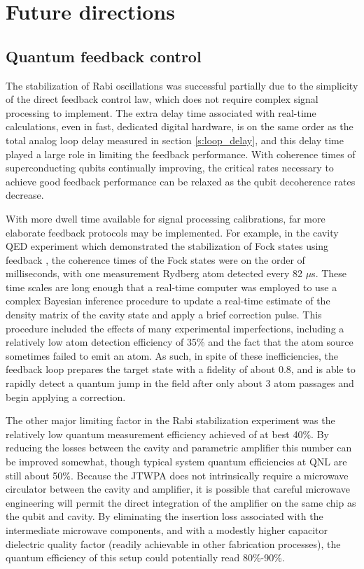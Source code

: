 \chapter{Future directions}
\label{c:conclusion}

\section{Quantum feedback control}

The stabilization of Rabi oscillations was successful partially due to the simplicity of the direct feedback control law, which does not require complex signal processing to implement.  The extra delay time associated with real-time calculations, even in fast, dedicated digital hardware, is on the same order as the total analog loop delay measured in section \ref{s:loop_delay}, and this delay time played a large role in limiting the feedback performance.  With coherence times of superconducting qubits continually improving, the critical rates necessary to achieve good feedback performance can be relaxed as the qubit decoherence rates decrease.

With more dwell time available for signal processing calibrations, far more elaborate feedback protocols may be implemented.  For example, in the cavity QED experiment which demonstrated the stabilization of Fock states using feedback \cite{haroche_fb}, the coherence times of the Fock states were on the order of milliseconds, with one measurement Rydberg atom detected every 82 $\mu$s.  These time scales are long enough that a real-time computer was employed to use a complex Bayesian inference procedure to update a real-time estimate of the density matrix of the cavity state and apply a brief correction pulse.  This procedure included the effects of many experimental imperfections, including a relatively low atom detection efficiency of 35\% and the fact that the atom source sometimes failed to emit an atom.  As such, in spite of these inefficiencies, the feedback loop prepares the target state with a fidelity of about 0.8, and is able to rapidly detect a quantum jump in the field after only about 3 atom passages and begin applying a correction.

The other major limiting factor in the Rabi stabilization experiment was the relatively low quantum measurement efficiency achieved of at best 40\%.  By reducing the losses between the cavity and parametric amplifier this number can be improved somewhat, though typical system quantum efficiencies at QNL are still about 50\%.  Because the JTWPA does not intrinsically require a microwave circulator between the cavity and amplifier, it is possible that careful microwave engineering will permit the direct integration of the amplifier on the same chip as the qubit and cavity.  By eliminating the insertion loss associated with the intermediate microwave components, and with a modestly higher capacitor dielectric quality factor (readily achievable in other fabrication processes), the quantum efficiency of this setup could potentially read 80\%-90\%.

